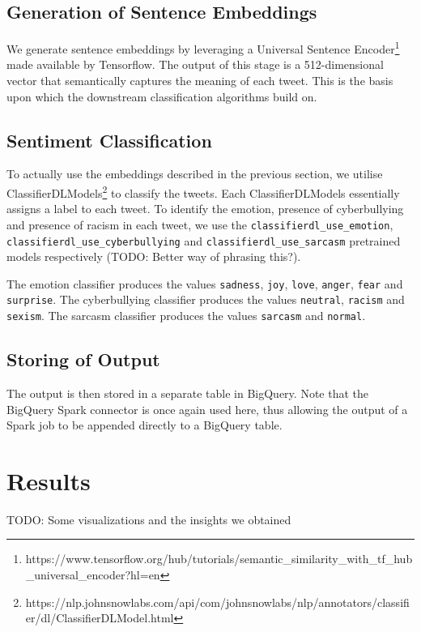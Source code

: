 \documentclass[a4paper,12pt]{article}
\begin{document}
\subsection{Generation of Sentence Embeddings}
\label{sec:sentence-embeddings}
We generate sentence embeddings by leveraging a Universal Sentence Encoder\footnote{https://www.tensorflow.org/hub/tutorials/semantic\_similarity\_with\_tf\_hub\_universal\_encoder?hl=en} made available by Tensorflow. The output of this stage is a 512-dimensional vector that semantically captures the meaning of each tweet. This is the basis upon which the downstream classification algorithms build on.

\subsection{Sentiment Classification}
To actually use the embeddings described in the previous section, we utilise ClassifierDLModels\footnote{https://nlp.johnsnowlabs.com/api/com/johnsnowlabs/nlp/annotators/classifier/dl/ClassifierDLModel.html} to classify the tweets. Each ClassifierDLModels essentially assigns a label to each tweet. To identify the emotion, presence of cyberbullying and presence of racism in each tweet, we use the \texttt{classifierdl\_use\_emotion}, \texttt{classifierdl\_use\_cyberbullying} and \texttt{classifierdl\_use\_sarcasm} pretrained models respectively ({\color{red}TODO: Better way of phrasing this?}). 

The emotion classifier produces the values \texttt{sadness}, \texttt{joy}, \texttt{love}, \texttt{anger}, \texttt{fear} and \texttt{surprise}. The cyberbullying classifier produces the values \texttt{neutral}, \texttt{racism} and \texttt{sexism}. The sarcasm classifier produces the values \texttt{sarcasm} and \texttt{normal}. 

\subsection{Storing of Output}
The output is then stored in a separate table in BigQuery. Note that the BigQuery Spark connector is once again used here, thus allowing the output of a Spark job to be appended directly to a BigQuery table.

\section{Results}
TODO: Some visualizations and the insights we obtained
\end{document}
